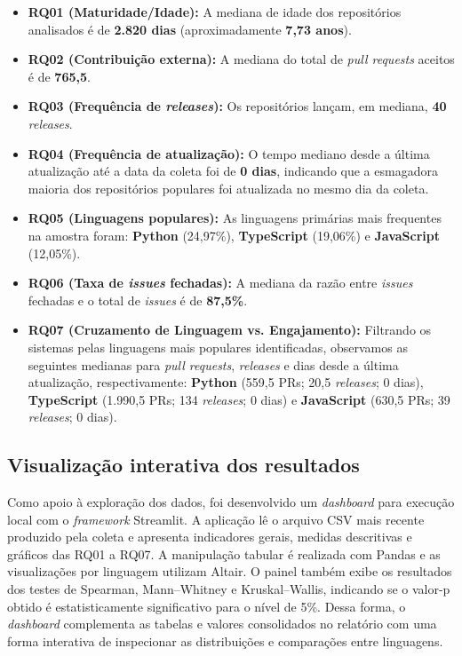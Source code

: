 \documentclass[
	article,			%
	11pt,				%
	oneside,			%
	a4paper,			%
	english,			%
	brazil,				%
	sumario=tradicional
	]{abntex2}
\begin{document}
\begin{itemize}
    \item \textbf{RQ01 (Maturidade/Idade):} A mediana de idade dos repositórios analisados é de \textbf{2.820 dias} (aproximadamente \textbf{7,73 anos}).
    \item \textbf{RQ02 (Contribuição externa):} A mediana do total de \textit{pull requests} aceitos é de \textbf{765,5}.
    \item \textbf{RQ03 (Frequência de \textit{releases}):} Os repositórios lançam, em mediana, \textbf{40} \textit{releases}.
    \item \textbf{RQ04 (Frequência de atualização):} O tempo mediano desde a última atualização até a data da coleta foi de \textbf{0 dias}, indicando que a esmagadora maioria dos repositórios populares foi atualizada no mesmo dia da coleta.
    \item \textbf{RQ05 (Linguagens populares):} As linguagens primárias mais frequentes na amostra foram: \textbf{Python} (24,97\%), \textbf{TypeScript} (19,06\%) e \textbf{JavaScript} (12,05\%).
    \item \textbf{RQ06 (Taxa de \textit{issues} fechadas):} A mediana da razão entre \textit{issues} fechadas e o total de \textit{issues} é de \textbf{87,5\%}.
    \item \textbf{RQ07 (Cruzamento de Linguagem vs. Engajamento):} Filtrando os sistemas pelas linguagens mais populares identificadas, observamos as seguintes medianas para \textit{pull requests}, \textit{releases} e dias desde a última atualização, respectivamente: \textbf{Python} (559,5 PRs; 20,5 \textit{releases}; 0 dias), \textbf{TypeScript} (1.990,5 PRs; 134 \textit{releases}; 0 dias) e \textbf{JavaScript} (630,5 PRs; 39 \textit{releases}; 0 dias).
\end{itemize}

\subsection{Visualização interativa dos resultados}

Como apoio à exploração dos dados, foi desenvolvido um \textit{dashboard} para execução local com o \textit{framework} Streamlit. A aplicação lê o arquivo CSV mais recente produzido pela coleta e apresenta indicadores gerais, medidas descritivas e gráficos das RQ01 a RQ07. A manipulação tabular é realizada com Pandas e as visualizações por linguagem utilizam Altair. O painel também exibe os resultados dos testes de Spearman, Mann--Whitney e Kruskal--Wallis, indicando se o valor-p obtido é estatisticamente significativo para o nível de 5\%. Dessa forma, o \textit{dashboard} complementa as tabelas e valores consolidados no relatório com uma forma interativa de inspecionar as distribuições e comparações entre linguagens.
\end{document}
